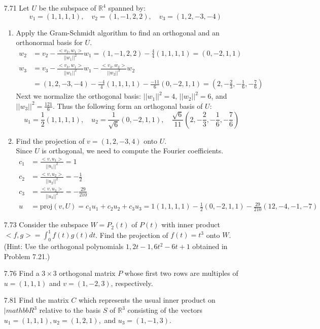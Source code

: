 \documentclass[12pt]{article}
\theoremstyle{definition}
\theoremstyle{plain}
\begin{document}
\begin{enumerate}
\item[7.71]Let $U$ be the subspace of $\mathbb{R}^4$ spanned by:
\[ v_1=(1,1,1,1), \quad v_2=(1,-1,2,2), \quad v_3=(1,2,-3,-4) \]
	\begin{enumerate}
	\item Apply the Gram-Schmidt algorithm to find an orthogonal and an orthonormal basis for $U$.
		\begin{align*}
		w_2&=v_2-\frac{<v_2,w_1>}{||w_1||^2}w_1 = (1,-1,2,2)-\frac{4}{4}(1,1,1,1) = (0,-2,1,1)\\
		w_3&=v_3-\frac{<v_3,w_1>}{||w_1||^2}w_1-\frac{<v_3,w_2>}{||w_2||^2}w_2\\
		&= (1,2,-3,-4)-\frac{-4}{4}(1,1,1,1)-\frac{-11}{6}(0,-2,1,1) = (2,-\frac{2}{3},-\frac{1}{6},-\frac{7}{6})
		\end{align*}
		Next we normalize the orthogonal basis: $||w_1||^2 = 4$, $||w_2||^2=6$, and $||w_3||^2=\frac{121}{6}$. Thus the following form an orthogonal basis of $U$:
		\[ u_1=\frac{1}{2}(1,1,1,1), \quad u_2=\frac{1}{\sqrt{6}}(0,-2,1,1), \quad \frac{\sqrt{6}}{11}(2,-\frac{2}{3},-\frac{1}{6},-\frac{7}{6}) \]
	\item Find the projection of $v=(1,2,-3,4)$ onto $U$.\\
	Since $U$ is orthogonal, we need to compute the Fourier coefficients.
	\begin{align*}
	c_1 &= \frac{<v,u_1>}{||u_1||^2} = 1\\
	c_2 &= \frac{<v,u_2>}{||u_2||^2} = -\frac{1}{2}\\
	c_3 &= \frac{<v,u_3>}{||u_3||^2} = -\frac{29}{210}\\
	u&=\mathrm{proj}(v,U)=c_1u_1+c_2u_2+c_3u_3 = 1(1,1,1,1)-\frac{1}{2}(0,-2,1,1)-\frac{29}{210}(12,-4,-1,-7)
	\end{align*}
	\end{enumerate}

\item[7.73]Consider the subspace $W=P_2(t)$ of $P(t)$ with inner product $<f,g>=\int_0^1f(t)g(t)dt$. Find the projection of $f(t)=t^3$ onto $W$. (Hint: Use the orthogonal polynomials $1,2t-1,6t^2-6t+1$ obtained in Problem 7.21.)

\item[7.76]Find a $3\times 3$ orthogonal matrix $P$ whose first two rows are multiples of $u=(1,1,1)$ and $v=(1,-2,3)$, respectively.

\item[7.81]Find the matrix $C$ which represents the usual inner product on $|mathbb{R}^3$ relative to the basis $S$ of $\mathbb{R}^3$ consisting of the vectors $u_1=(1,1,1),u_2=(1,2,1),$ and $u_3=(1,-1,3)$.


\end{enumerate}
\end{document}
